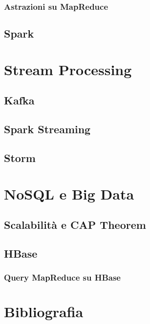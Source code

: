 \documentclass[italian,a4paper, twoside, 12pt]{report}
\begin{document}
\subsection{Astrazioni su MapReduce}\label{astrazioni-su-mapreduce}

\section{Spark}\label{spark}

\chapter{Stream Processing}\label{stream-processing}

\section{Kafka}\label{kafka}

\section{Spark Streaming}\label{spark-streaming}

\section{Storm}\label{storm}

\chapter{NoSQL e Big Data}\label{nosql-e-big-data}

\section{Scalabilità e CAP Theorem}\label{scalabilituxe0-e-cap-theorem}

\section{HBase}\label{hbase}

\subsection{Query MapReduce su HBase}\label{query-mapreduce-su-hbase}

\chapter*{Bibliografia}\label{bibliografia}
\end{document}
